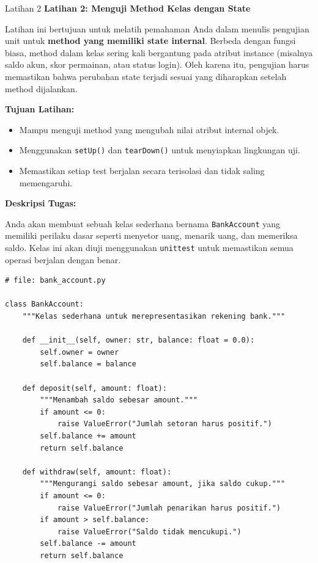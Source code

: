 \documentclass[aspectratio=169, table]{beamer}
\begin{document}
\begin{frame}[fragile,allowframebreaks=0.8]{Latihan 2}
\footnotesize
\textbf{Latihan 2: Menguji Method Kelas dengan State}\par\medskip
Latihan ini bertujuan untuk melatih pemahaman Anda dalam menulis pengujian unit untuk \textbf{method yang memiliki state internal}.  
Berbeda dengan fungsi biasa, method dalam kelas sering kali bergantung pada atribut instance (misalnya saldo akun, skor permainan, atau status login).  
Oleh karena itu, pengujian harus memastikan bahwa perubahan state terjadi sesuai yang diharapkan setelah method dijalankan.

\medskip\textbf{Tujuan Latihan:}\par 
\begin{itemize}
    \item Mampu menguji method yang mengubah nilai atribut internal objek.
    \item Menggunakan \texttt{setUp()} dan \texttt{tearDown()} untuk menyiapkan lingkungan uji.
    \item Memastikan setiap test berjalan secara terisolasi dan tidak saling memengaruhi.
\end{itemize}

\medskip\textbf{Deskripsi Tugas:}\par 

Anda akan membuat sebuah kelas sederhana bernama \texttt{BankAccount} yang memiliki perilaku dasar seperti menyetor uang, menarik uang, dan memeriksa saldo.  
Kelas ini akan diuji menggunakan \texttt{unittest} untuk memastikan semua operasi berjalan dengan benar.

\begin{lstlisting}[style=PythonStyle, breaklines=true]
# file: bank_account.py

class BankAccount:
    """Kelas sederhana untuk merepresentasikan rekening bank."""

    def __init__(self, owner: str, balance: float = 0.0):
        self.owner = owner
        self.balance = balance

    def deposit(self, amount: float):
        """Menambah saldo sebesar amount."""
        if amount <= 0:
            raise ValueError("Jumlah setoran harus positif.")
        self.balance += amount
        return self.balance

    def withdraw(self, amount: float):
        """Mengurangi saldo sebesar amount, jika saldo cukup."""
        if amount <= 0:
            raise ValueError("Jumlah penarikan harus positif.")
        if amount > self.balance:
            raise ValueError("Saldo tidak mencukupi.")
        self.balance -= amount
        return self.balance


\end{lstlisting}
\end{frame}
\end{document}
